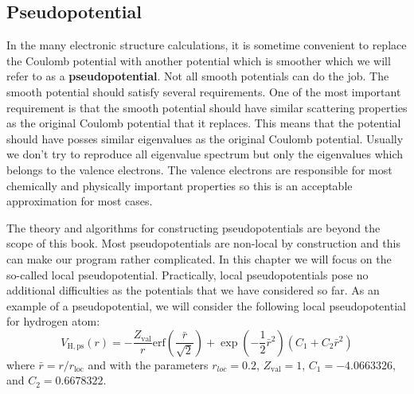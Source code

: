 \subsection{Pseudopotential}

In the many electronic structure calculations, it is sometime convenient to replace the
Coulomb potential with another potential which is smoother which we
will refer to as a \textbf{pseudopotential}. Not all smooth
potentials can do the job. The smooth potential should satisfy several requirements.
One of the most important requirement is that the smooth potential should have similar
scattering properties as the original Coulomb potential that it replaces.
This means that the potential should have posses similar eigenvalues as the
original Coulomb potential. Usually we don't try to reproduce all eigenvalue spectrum but only
the eigenvalues which belongs to the valence electrons. The valence electrons are
responsible for most chemically and physically important properties so this is an
acceptable approximation for most cases.

The theory and algorithms for constructing pseudopotentials are beyond the scope of
this book.
Most pseudopotentials are non-local by construction and this can make our program rather
complicated.
In this chapter we will focus on the so-called local pseudopotential. Practically, local
pseudopotentials pose no additional difficulties as the potentials that we have
considered so far. As an example of a pseudopotential, we will consider the following
local pseudopotential for hydrogen atom:
\begin{equation}
V_{\mathrm{H,ps}}(r) = -\frac{Z_{\mathrm{val}}}{r}
\mathrm{erf}\left( \frac{\bar{r}}{\sqrt{2}} \right) +
\exp\left( -\frac{1}{2}\bar{r}^2 \right)
\left( C_{1} + C_{2}\bar{r}^2 \right)
\label{eq:H_psp_GTH}
\end{equation}
where $\bar{r}=r/r_{\mathrm{loc}}$ and with the parameters $r_{loc}=0.2$, 
$Z_{\mathrm{val}}=1$, $C_{1}=-4.0663326$, and $C_{2}=0.6678322$.

